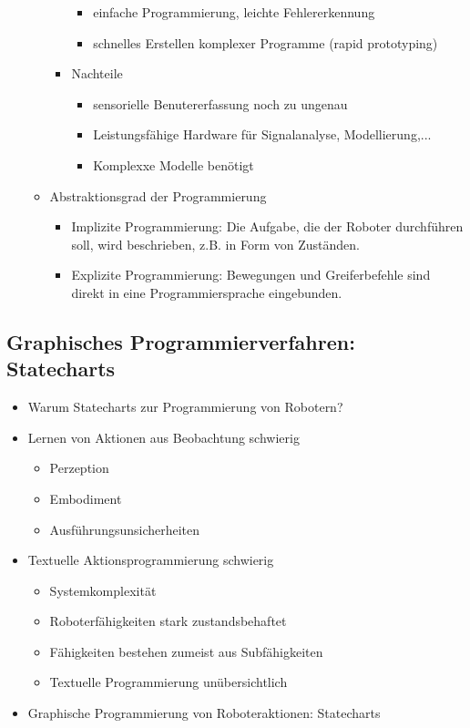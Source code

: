 \documentclass[paper=a4, fontsize=11pt]{scrartcl} %
\numberwithin{equation}{section} %
\numberwithin{figure}{section} %
\numberwithin{table}{section} %
\begin{document}
\begin{enumerate}
\begin{itemize}
\begin{itemize}
\begin{itemize}
\item einfache Programmierung, leichte Fehlererkennung
\item schnelles Erstellen komplexer Programme (rapid prototyping)
\end{itemize}
\item Nachteile
\begin{itemize}
\item sensorielle Benutererfassung noch zu ungenau
\item Leistungsfähige Hardware für Signalanalyse, Modellierung,...
\item Komplexxe Modelle benötigt
\end{itemize}
\end{itemize}
\item Abstraktionsgrad der Programmierung
\begin{itemize}
\item Implizite Programmierung: Die Aufgabe, die der Roboter durchführen soll, wird beschrieben, z.B. in Form von Zuständen.
\item Explizite Programmierung: Bewegungen und Greiferbefehle sind direkt in eine Programmiersprache eingebunden.
\end{itemize}
\end{itemize}
\end{enumerate}

\subsection{Graphisches Programmierverfahren: Statecharts}

\begin{itemize}
\item Warum Statecharts zur Programmierung von Robotern?
\item Lernen von Aktionen aus Beobachtung schwierig
\begin{itemize}
\item Perzeption
\item Embodiment
\item Ausführungsunsicherheiten
\end{itemize}
\item Textuelle Aktionsprogrammierung schwierig
\begin{itemize}
\item Systemkomplexität
\item Roboterfähigkeiten stark zustandsbehaftet
\item Fähigkeiten bestehen zumeist aus Subfähigkeiten
\item Textuelle Programmierung unübersichtlich
\end{itemize}
\item Graphische Programmierung von Roboteraktionen: Statecharts
\end{itemize}
\end{document}
